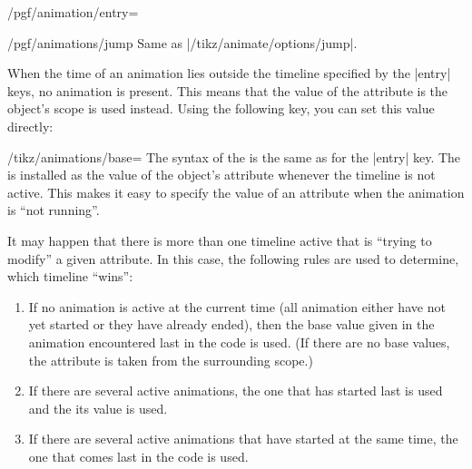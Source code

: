 \begin{key}{/pgf/animation/entry=}
    \begin{key}{/pgf/animations/jump}
        Same as |/tikz/animate/options/jump|.
\begin{codeexample}[animation list={0.5,1,1.5,2}]
\end{codeexample}
    \end{key}
\end{key}

When the time of an animation lies outside the timeline specified by the
|entry| keys, no animation is present. This means that the value of the
attribute is the object's scope is used instead. Using the following key, you
can set this value directly:

\begin{key}{/tikz/animations/base=}
    The syntax of the  is the same as for the |entry| key. The
     is installed as the value of the object's attribute whenever
    the timeline is not active. This makes it easy to specify the value of an
    attribute when the animation is ``not running''.
\begin{codeexample}[animation list={-1,0,1,2,3}]
\end{codeexample}
\end{key}

It may happen that there is more than one timeline active that is ``trying to
modify'' a given attribute. In this case, the following rules are used to
determine, which timeline ``wins'':
%
\begin{enumerate}
    \item If no animation is active at the current time (all animation either
        have not yet started or they have already ended), then the base value
        given in the animation encountered last in the code is used. (If there
        are no base values, the attribute is taken from the surrounding scope.)
    \item If there are several active animations, the one that has started last
        is used and the its value is used.
    \item If there are several active animations that have started at the same
        time, the one that comes last in the code is used.
\end{enumerate}

